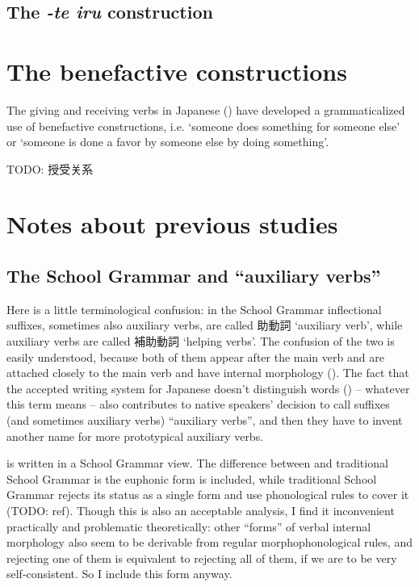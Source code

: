 \documentclass[UTF8, a4paper, oneside, scheme=plain]{ctexrep}
\newcommand{\corpus}[1]{\emph{#1}}
\newcommand{\translate}[1]{`#1'}
\begin{document}
\subsection{The \corpus{-te iru} construction}\label{sec:te-iru}

\section{The benefactive constructions}

The giving and receiving verbs in Japanese () 
have developed a grammaticalized use of benefactive constructions,
i.e. \translate{someone does something for someone else}
or \translate{someone is done a favor by someone else by doing something}.

TODO: 授受关系


\section{Notes about previous studies}\label{sec:verb-complex-previous}

\subsection{The School Grammar and ``auxiliary verbs''}\label{sec:so-called-auxiliary-verb}

Here is a little terminological confusion:
in the School Grammar inflectional suffixes,
sometimes also auxiliary verbs, are called 助動詞 \translate{auxiliary verb},
while auxiliary verbs are called 補助動詞 \translate{helping verbs}.
The confusion of the two is easily understood,
because both of them appear after the main verb
and are attached closely to the main verb 
and have internal morphology ().
The fact that the accepted writing system for Japanese doesn't distinguish words 
() -- whatever this term means -- 
also contributes to native speakers' decision to call suffixes (and sometimes auxiliary verbs) ``auxiliary verbs'',
and then they have to invent another name for more prototypical auxiliary verbs.

 is written in a School Grammar view.
The difference between  and traditional School Grammar 
is the euphonic form is included,
while traditional School Grammar rejects its status as a single form
and use phonological rules to cover it (TODO: ref).
Though this is also an acceptable analysis,
I find it inconvenient practically and problematic theoretically:
other ``forms'' of verbal internal morphology also seem to
be derivable from regular morphophonological rules,
and rejecting one of them is equivalent to rejecting all of them,
if we are to be very self-consistent.
So I include this form anyway.
\end{document}
